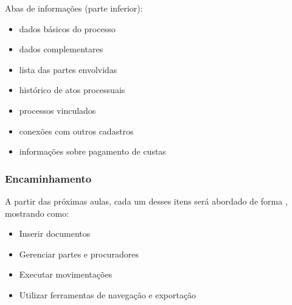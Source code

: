 \documentclass[letterpaper,10pt,brazil]{sphinxmanual}
\begin{document}
\sphinxAtStartPar
Abas de informações (parte inferior):
\begin{itemize}
\item {} 
\sphinxAtStartPar
{} \textendash{} dados básicos do processo

\item {} 
\sphinxAtStartPar
{} \textendash{} dados complementares

\item {} 
\sphinxAtStartPar
{} \textendash{} lista das partes envolvidas

\item {} 
\sphinxAtStartPar
{} \textendash{} histórico de atos processuais

\item {} 
\sphinxAtStartPar
{} \textendash{} processos vinculados

\item {} 
\sphinxAtStartPar
{} \textendash{} conexões com outros cadastros

\item {} 
\sphinxAtStartPar
{} \textendash{} informações sobre pagamento de custas

\end{itemize}


\subsubsection{Encaminhamento}
\label{\detokenize{projud_11_telainicialprocesso:encaminhamento}}
\sphinxAtStartPar
A partir das próximas aulas, cada um desses itens será abordado de forma , mostrando como:
\begin{itemize}
\item {} 
\sphinxAtStartPar
Inserir documentos

\item {} 
\sphinxAtStartPar
Gerenciar partes e procuradores

\item {} 
\sphinxAtStartPar
Executar movimentações

\item {} 
\sphinxAtStartPar
Utilizar ferramentas de navegação e exportação

\end{itemize}
\end{document}
